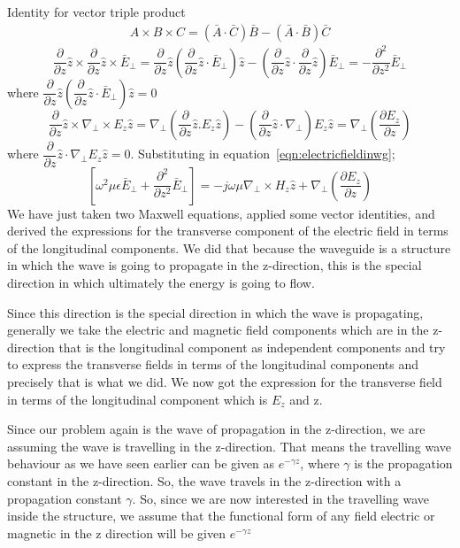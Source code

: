 Identity for vector triple product
\begin{align*}
A\times B\times C = (\bar{A}\cdot\bar{C})\bar{B} - (\bar{A}\cdot\bar{B})\bar{C}
\end{align*}
\begin{dmath*}
\frac{\partial}{\partial z}\hat{z}\times\frac{\partial}{\partial z}\hat{z}\times\bar{E}_\bot = \frac{\partial}{\partial z}\hat{z}\left(\frac{\partial}{\partial z}\hat{z}\cdot\bar{E}_\bot\right)\hat{z} - \left(\frac{\partial}{\partial z}\hat{z}\cdot\frac{\partial}{\partial z}\hat{z}\right)\bar{E}_\bot = -\frac{\partial^2}{\partial z^2}\bar{E}_\bot
\end{dmath*}
where $\dfrac{\partial}{\partial z}\hat{z}\left(\dfrac{\partial}{\partial z}\hat{z}\cdot\bar{E}_\bot\right)\hat{z} = 0$
\begin{dmath*}
\frac{\partial}{\partial z}\hat{z}\times\nabla_\bot\times E_z\hat{z} = \nabla_\bot\left(\frac{\partial}{\partial z}\hat{z}.E_z\hat{z}\right) - \left(\frac{\partial}{\partial z}\hat{z}\cdot\nabla_\bot\right)E_z\hat{z} = \nabla_\bot\left(\frac{\partial E_z}{\partial z}\right)
\end{dmath*}
where $\dfrac{\partial}{\partial z}\hat{z}\cdot\nabla_\bot E_z\hat{z} = 0$. Substituting in equation~\ref{eqn:electricfieldinwg};
\begin{dmath}
\left[\omega^2\mu\epsilon\bar{E}_\bot+\frac{\partial^2}{\partial z^2}\bar{E}_\bot\right] = -j\omega\mu\nabla_\bot\times H_z\hat{z} + \nabla_\bot\left(\frac{\partial E_z}{\partial z}\right)
\end{dmath}
We have just taken two Maxwell equations, applied some vector identities, and derived the expressions for the transverse component of the electric field in terms of the longitudinal components. We did that because the waveguide is a structure in which the wave is going to propagate in the z-direction, this is the special direction in which ultimately the energy is going to flow.

Since this direction is the special direction in which the wave is propagating, generally we take the electric and magnetic field components which are in the z-direction that is the longitudinal component as independent components and try to express the transverse fields in terms of the longitudinal components and precisely that is what we did. We now got the expression for the transverse field in terms of the longitudinal component which is $E_z$ and z.

Since our problem again is the wave of propagation in the z-direction, we are assuming the wave is travelling in the z-direction. That means the travelling wave behaviour as we have seen earlier can be given as $e^{-\gamma z}$, where $\gamma$ is the propagation constant in the z-direction. So, the wave travels in the z-direction with a propagation constant $\gamma$. So, since we are now interested in the travelling wave inside the structure, we assume that the functional form of any field electric or magnetic in the z direction will be given $e^{-\gamma z}$

